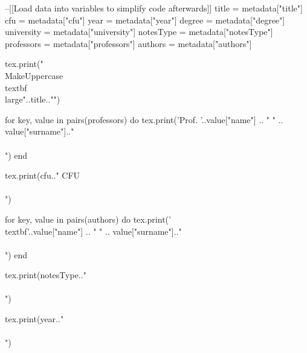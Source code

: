 \begin{luacode}
--[[Load data into variables to simplify code afterwards]]
title = metadata["title"]
cfu = metadata["cfu"]
year = metadata["year"]
degree = metadata["degree"]
university = metadata["university"]
notesType = metadata["notesType"]
professors = metadata["professors"]
authors = metadata["authors"]
\end{luacode}


\begin{titlepage}
\begin{center}
\vspace*{1em}
\begin{luacode}
		tex.print("\\MakeUppercase{\\textbf{\\large{"..title.."}}}")
\end{luacode}

\vspace{1em}

\begin{luacode}
		for key, value in pairs(professors) do
			 tex.print('Prof. '..value["name"] .. " " .. value["surname"].."\\\\")
		end
\end{luacode}
\begin{luacode}
		tex.print(cfu.." CFU\\\\")
\end{luacode}

\vspace{1em}

\begin{luacode}
		for key, value in pairs(authors) do
			 tex.print('\\textbf{'..value["name"] .. " " .. value["surname"].."}\\\\")
		end
\end{luacode}
                
\vfill
        
\begin{luacode}
		tex.print(notesType.."\\\\")
\end{luacode}
\begin{luacode}
		tex.print(year.."\\\\")
\end{luacode}


\end{center}
\end{titlepage}
